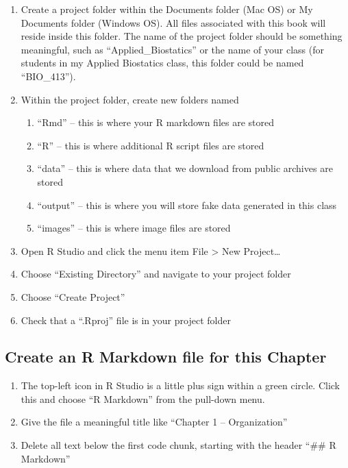\documentclass[]{book}
\providecommand{\tightlist}{%
  \setlength{\itemsep}{0pt}\setlength{\parskip}{0pt}}
\begin{document}
\begin{enumerate}
\def\labelenumi{\arabic{enumi}.}
\tightlist
\item
  Create a project folder within the Documents folder (Mac OS) or My Documents folder (Windows OS). All files associated with this book will reside inside this folder. The name of the project folder should be something meaningful, such as ``Applied\_Biostatics'' or the name of your class (for students in my Applied Biostatics class, this folder could be named ``BIO\_413'').
\item
  Within the project folder, create new folders named

  \begin{enumerate}
  \def\labelenumii{\arabic{enumii}.}
  \tightlist
  \item
    ``Rmd'' -- this is where your R markdown files are stored
  \item
    ``R'' -- this is where additional R script files are stored
  \item
    ``data'' -- this is where data that we download from public archives are stored
  \item
    ``output'' -- this is where you will store fake data generated in this class
  \item
    ``images'' -- this is where image files are stored
  \end{enumerate}
\item
  Open R Studio and click the menu item File \textgreater{} New Project\ldots{}
\item
  Choose ``Existing Directory'' and navigate to your project folder
\item
  Choose ``Create Project''
\item
  Check that a ``.Rproj'' file is in your project folder
\end{enumerate}

\hypertarget{create-an-r-markdown-file-for-this-chapter}{%
\subsection{Create an R Markdown file for this Chapter}\label{create-an-r-markdown-file-for-this-chapter}}

\begin{enumerate}
\def\labelenumi{\arabic{enumi}.}
\tightlist
\item
  The top-left icon in R Studio is a little plus sign within a green circle. Click this and choose ``R Markdown'' from the pull-down menu.
\item
  Give the file a meaningful title like ``Chapter 1 -- Organization''
\item
  Delete all text below the first code chunk, starting with the header ``\#\# R Markdown''
\end{enumerate}
\end{document}
